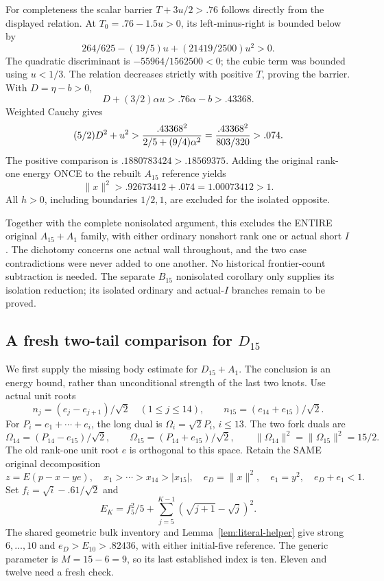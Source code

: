 \documentclass[11pt]{article}
\begin{document}
For completeness the scalar barrier \(T+3u/2>.76\) follows
directly from the displayed relation.
At \(T_0=.76-1.5u>0\), its left-minus-right is bounded below by
\[
                  264/625-(19/5)u+(21419/2500)u^2>0 .
\]
The quadratic discriminant is \(-55964/1562500<0\);
the cubic term was bounded using \(u<1/3\).
The relation decreases strictly with positive \(T\), proving
the barrier.
With \(D=\eta-b>0\),
\[
 D+(3/2)\alpha u>.76\alpha-b>.43368.
\]
Weighted Cauchy gives
\[
 (5/2)D^2+u^2>
 {.43368^2\over2/5+(9/4)\alpha^2}
 ={.43368^2\over803/320}>.074 .
\]
The positive comparison is
\(.1880783424>.18569375\).
Adding the original rank-one energy ONCE to the rebuilt
\(A_{15}\) reference yields
\[
                     \|x\|^2>.92673412+.074=1.00073412>1 .
\]
All \(h>0\), including boundaries \(1/2,1\), are excluded
for the isolated opposite.

Together with the complete nonisolated argument, this excludes
the ENTIRE original \(A_{15}+A_1\) family, with either ordinary
nonshort rank one or actual short \(I\).
The dichotomy concerns one actual wall throughout, and the two
case contradictions were never added to one another.
No historical frontier-count subtraction is needed.
The separate \(B_{15}\) nonisolated corollary only supplies its
isolation reduction; its isolated ordinary and actual-\(I\)
branches remain to be proved.
\subsection{A fresh two-tail comparison for \(D_{15}\)}
\label{app:arithD15body}

We first supply the missing body estimate for \(D_{15}+A_1\).
The conclusion is an energy bound, rather than unconditional
strength of the last two knots.
Use actual unit roots
\[
 n_j=(e_j-e_{j+1})/\sqrt2\quad(1\le j\le14),\qquad
 n_{15}=(e_{14}+e_{15})/\sqrt2 .
\]
For \(P_i=e_1+\cdots+e_i\), the long dual is
\(\Omega_i=\sqrt2P_i\), \(i\le13\).
The two fork duals are
\[
 \Omega_{14}=(P_{14}-e_{15})/\sqrt2,\qquad
 \Omega_{15}=(P_{14}+e_{15})/\sqrt2,\qquad
 \|\Omega_{14}\|^2=\|\Omega_{15}\|^2=15/2 .
\]
The old rank-one unit root \(e\) is orthogonal to this space.
Retain the SAME original decomposition
\[
 z=E(p-x-y e),\quad x_1>\cdots>x_{14}>|x_{15}|,\quad
 e_D=\|x\|^2,\quad e_1=y^2,\quad e_D+e_1<1 .
\]
Set \(f_i=\sqrt i-.61/\sqrt2\) and
\[
 E_K=f_5^2/5+\sum_{j=5}^{K-1}(\sqrt{j+1}-\sqrt j)^2.
\]
The shared geometric bulk inventory and
Lemma~\ref{lem:literal-helper} give strong \(6,\ldots,10\)
and \(e_D>E_{10}>.82436\), with either initial-five reference.
The generic parameter is \(M=15-6=9\), so its last
established index is ten.  Eleven and twelve need a fresh check.
\end{document}
